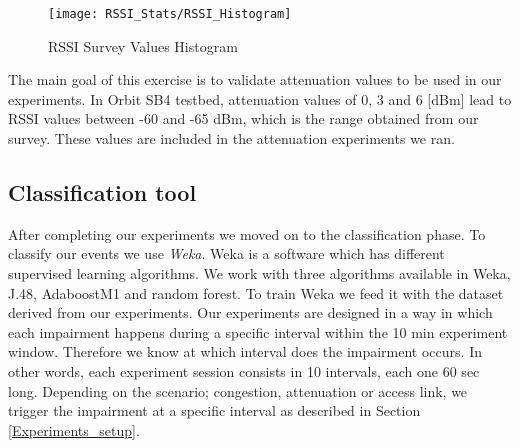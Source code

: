 \begin{figure}[h]
	\centering
	\texttt{[image: RSSI\_Stats/RSSI\_Histogram]}
	\caption{RSSI Survey Values Histogram}
	\label{fig:RSSI_Histogram}
\end{figure}

The main goal of this exercise is to validate attenuation values to be used in our experiments. In Orbit SB4 testbed, attenuation values of 0, 3 and 6 [dBm] lead to RSSI values between -60 and -65 dBm, which is the range obtained from our survey. These values are included in the attenuation experiments we ran.

\subsection{Classification tool}

After completing our experiments we moved on to the classification phase. To classify our events we use \emph{Weka}. Weka is a software which has different supervised learning algorithms. We work with three algorithms available in Weka, J.48, AdaboostM1 and random forest. To train Weka we feed it with the dataset derived from our experiments. Our experiments are designed in a way in which each impairment happens during a specific interval within the 10 min experiment window. Therefore we know at which interval does the impairment occurs. In other words, each experiment session consists in 10 intervals, each one 60 sec long. Depending on the scenario; congestion, attenuation or access link, we trigger the impairment at a specific interval as described in Section \ref{Experiments_setup}.





